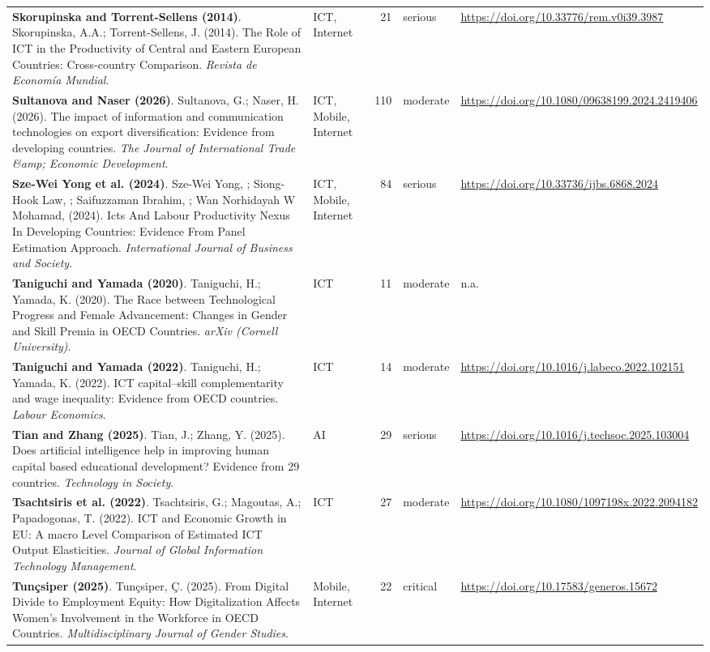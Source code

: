 {\begin{longtable}{@{}p{7.4cm} p{1.3cm} r l p{3.4cm}@{}}
\textbf{Skorupinska and Torrent-Sellens (2014)}. Skorupinska, A.A.; Torrent-Sellens, J. (2014). The Role of ICT in the Productivity of Central and Eastern European Countries: Cross-country Comparison. \emph{Revista de Economía Mundial}. & ICT, Internet & 21 & serious & \url{https://doi.org/10.33776/rem.v0i39.3987} \\
\textbf{Sultanova and Naser (2026)}. Sultanova, G.; Naser, H. (2026). The impact of information and communication technologies on export diversification: Evidence from developing countries. \emph{The Journal of International Trade \&amp; Economic Development}. & ICT, Mobile, Internet & 110 & moderate & \url{https://doi.org/10.1080/09638199.2024.2419406} \\
\textbf{Sze-Wei Yong et al. (2024)}. Sze-Wei Yong, ; Siong-Hook Law, ; Saifuzzaman Ibrahim, ; Wan Norhidayah W Mohamad,  (2024). Icts And Labour Productivity Nexus In Developing Countries: Evidence From Panel Estimation Approach. \emph{International Journal of Business and Society}. & ICT, Mobile, Internet & 84 & serious & \url{https://doi.org/10.33736/ijbs.6868.2024} \\
\textbf{Taniguchi and Yamada (2020)}. Taniguchi, H.; Yamada, K. (2020). The Race between Technological Progress and Female Advancement: Changes in Gender and Skill Premia in OECD Countries. \emph{arXiv (Cornell University)}. & ICT & 11 & moderate & n.a. \\
\textbf{Taniguchi and Yamada (2022)}. Taniguchi, H.; Yamada, K. (2022). ICT capital–skill complementarity and wage inequality: Evidence from OECD countries. \emph{Labour Economics}. & ICT & 14 & moderate & \url{https://doi.org/10.1016/j.labeco.2022.102151} \\
\textbf{Tian and Zhang (2025)}. Tian, J.; Zhang, Y. (2025). Does artificial intelligence help in improving human capital based educational development? Evidence from 29 countries. \emph{Technology in Society}. & AI & 29 & serious & \url{https://doi.org/10.1016/j.techsoc.2025.103004} \\
\textbf{Tsachtsiris et al. (2022)}. Tsachtsiris, G.; Magoutas, A.; Papadogonas, T. (2022). ICT and Economic Growth in EU: A macro Level Comparison of Estimated ICT Output Elasticities. \emph{Journal of Global Information Technology Management}. & ICT & 27 & moderate & \url{https://doi.org/10.1080/1097198x.2022.2094182} \\
\textbf{Tunçsiper (2025)}. Tunçsiper, Ç. (2025). From Digital Divide to Employment Equity: How Digitalization Affects Women's Involvement in the Workforce in OECD Countries. \emph{Multidisciplinary Journal of Gender Studies}. & Mobile, Internet & 22 & critical & \url{https://doi.org/10.17583/generos.15672} \\

\end{longtable}}
